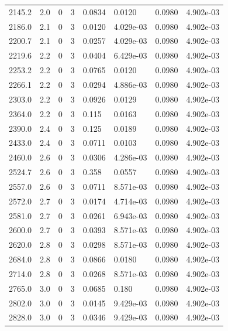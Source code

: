 \documentclass[preview]{standalone}
\begin{document}
{{{{{\begin{tabular}{L{1.2cm}C{1.2cm} C{0.3cm}C{0.5cm} C{1.4cm}C{1.4cm} C{1.4cm}C{1.4cm}}
  2145.2  &   2.0  & 0     &  3 &  0.0834  & 0.0120  & 0.0980 &  4.902e-03   \\ 
  2186.0  &   2.1  & 0     &  3 &  0.0120  & 4.029e-03  & 0.0980 &  4.902e-03   \\ 
  2200.7  &   2.1  & 0     &  3 &  0.0257  & 4.029e-03  & 0.0980 &  4.902e-03   \\ 
  2219.6  &   2.2  & 0     &  3 &  0.0404  & 6.429e-03  & 0.0980 &  4.902e-03   \\ 
  2253.2  &   2.2  & 0     &  3 &  0.0765  & 0.0120  & 0.0980 &  4.902e-03   \\ 
  2266.1  &   2.2  & 0     &  3 &  0.0294  & 4.886e-03  & 0.0980 &  4.902e-03   \\ 
  2303.0  &   2.2  & 0     &  3 &  0.0926  & 0.0129  & 0.0980 &  4.902e-03   \\ 
  2364.0  &   2.2  & 0     &  3 &  0.115  & 0.0163  & 0.0980 &  4.902e-03   \\ 
  2390.0  &   2.4  & 0     &  3 &  0.125  & 0.0189  & 0.0980 &  4.902e-03   \\ 
  2433.0  &   2.4  & 0     &  3 &  0.0711  & 0.0103  & 0.0980 &  4.902e-03   \\ 
  2460.0  &   2.6  & 0     &  3 &  0.0306  & 4.286e-03  & 0.0980 &  4.902e-03   \\ 
  2524.7  &   2.6  & 0     &  3 &  0.358  & 0.0557  & 0.0980 &  4.902e-03   \\ 
  2557.0  &   2.6  & 0     &  3 &  0.0711  & 8.571e-03  & 0.0980 &  4.902e-03   \\ 
  2572.0  &   2.7  & 0     &  3 &  0.0174  & 4.714e-03  & 0.0980 &  4.902e-03   \\ 
  2581.0  &   2.7  & 0     &  3 &  0.0261  & 6.943e-03  & 0.0980 &  4.902e-03   \\ 
  2600.0  &   2.7  & 0     &  3 &  0.0393  & 8.571e-03  & 0.0980 &  4.902e-03   \\ 
  2620.0  &   2.8  & 0     &  3 &  0.0298  & 8.571e-03  & 0.0980 &  4.902e-03   \\ 
  2684.0  &   2.8  & 0     &  3 &  0.0866  & 0.0180  & 0.0980 &  4.902e-03   \\ 
  2714.0  &   2.8  & 0     &  3 &  0.0268  & 8.571e-03  & 0.0980 &  4.902e-03   \\ 
  2765.0  &   3.0  & 0     &  3 &  0.0685  & 0.180  & 0.0980 &  4.902e-03   \\ 
  2802.0  &   3.0  & 0     &  3 &  0.0145  & 9.429e-03  & 0.0980 &  4.902e-03   \\ 
  2828.0  &   3.0  & 0     &  3 &  0.0346  & 9.429e-03  & 0.0980 &  4.902e-03   \\ 

\end{tabular}}}}}}
\end{document}
